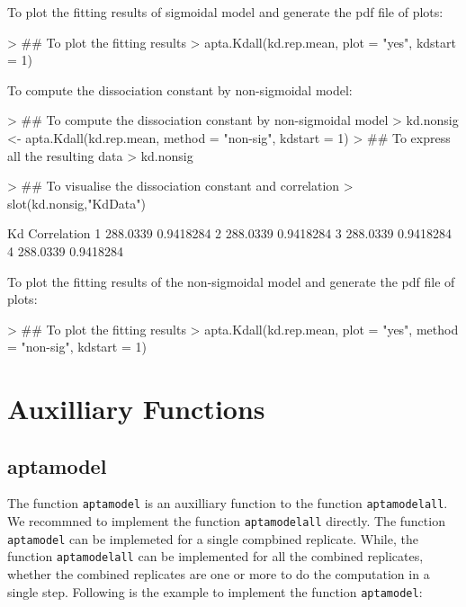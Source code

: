 \documentclass[11pt]{article}
\newcommand{\code}[1]{{\tt #1}}
\begin{document}
To plot the fitting results of sigmoidal model and generate the pdf file of plots:
\begin{Schunk}
\begin{Sinput}
> ## To plot the fitting results
> apta.Kdall(kd.rep.mean, plot = "yes", kdstart = 1)
\end{Sinput}
\end{Schunk}

To compute the dissociation constant by non-sigmoidal model:
\begin{Schunk}
\begin{Sinput}
> ## To compute the dissociation constant by non-sigmoidal model
> kd.nonsig <- apta.Kdall(kd.rep.mean, method = "non-sig", kdstart = 1)
> ## To express all the resulting data
> kd.nonsig
\end{Sinput}
\end{Schunk}

\begin{Schunk}
\begin{Sinput}
> ## To visualise the dissociation constant and correlation
> slot(kd.nonsig,"KdData")
\end{Sinput}
\begin{Soutput}
        Kd Correlation
1 288.0339   0.9418284
2 288.0339   0.9418284
3 288.0339   0.9418284
4 288.0339   0.9418284
\end{Soutput}
\end{Schunk}

To plot the fitting results of the non-sigmoidal model and generate the pdf file of plots:
\begin{Schunk}
\begin{Sinput}
> ## To plot the fitting results
> apta.Kdall(kd.rep.mean, plot = "yes", method = "non-sig", kdstart = 1)
\end{Sinput}
\end{Schunk}

\section{Auxilliary Functions}

\subsection{aptamodel}
The function \code{aptamodel} is an auxilliary function to the function \code{aptamodelall}.
We recommned to implement the function \code{aptamodelall} directly. The function \code{aptamodel}
can be implemeted for a single compbined replicate. While, the function \code{aptamodelall}
can be implemented for all the combined replicates, whether the combined replicates are one
or more to do the computation in a single step. Following is the example to implement the function
\code{aptamodel}:
\end{document}

